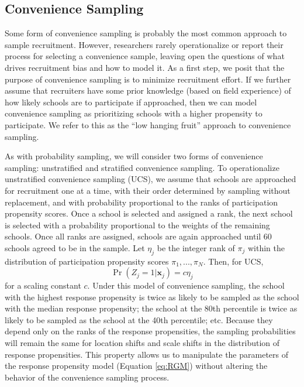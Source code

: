 \documentclass[
  english,
  man,floatsintext]{apa6}
\begin{document}
\hypertarget{convenience-sampling}{%
\subsection{Convenience Sampling}\label{convenience-sampling}}

Some form of convenience sampling is probably the most common approach to sample recruitment.
However, researchers rarely operationalize or report their process for selecting a convenience sample, leaving open the questions of what drives recruitment bias and how to model it. As a first step, we posit that the purpose of convenience sampling is to minimize recruitment effort. If we further assume that recruiters have some prior knowledge (based on field experience) of how likely schools are to participate if approached, then we can model convenience sampling as prioritizing schools with a higher propensity to participate. We refer to this as the ``low hanging fruit'' approach to convenience sampling.

As with probability sampling, we will consider two forms of convenience sampling: unstratified and stratified convenience sampling. To operationalize unstratified convenience sampling (UCS), we assume that schools are approached for recruitment one at a time, with their order determined by sampling without replacement, and with probability proportional to the ranks of participation propensity scores. Once a school is selected and assigned a rank, the next school is selected with a probability proportional to the weights of the remaining schools. Once all ranks are assigned, schools are again approached until 60 schools agreed to be in the sample. Let \(\eta_j\) be the integer rank of \(\pi_j\) within the distribution of participation propensity scores \(\pi_1,...,\pi_N\). Then, for UCS,
\begin{equation}
\Pr\left(Z_j = 1 | \mathbf{x}_j \right) = c \eta_j
\end{equation}
for a scaling constant \(c\).
Under this model of convenience sampling, the school with the highest response propensity is twice as likely to be sampled as the school with the median response propensity; the school at the 80th percentile is twice as likely to be sampled as the school at the 40th percentile; etc.
Because they depend only on the ranks of the response propensities, the sampling probabilities will remain the same for location shifts and scale shifts in the distribution of response propensities.
This property allows us to manipulate the parameters of the response propensity model (Equation \eqref{eq:RGM}) without altering the behavior of the convenience sampling process.
\end{document}
